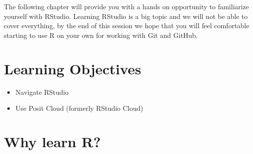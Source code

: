 \documentclass[
  letterpaper,
  DIV=11,
  numbers=noendperiod]{scrreprt}
\providecommand{\tightlist}{%
  \setlength{\itemsep}{0pt}\setlength{\parskip}{0pt}}\usepackage{longtable,booktabs,array}
\begin{document}
The following chapter will provide you with a hands on opportunity to
familiarize yourself with RStudio. Learning RStudio is a big topic and
we will not be able to cover everything, by the end of this session we
hope that you will feel comfortable starting to use R on your own for
working with Git and GitHub.

\hypertarget{learning-objectives}{%
\section{Learning Objectives}\label{learning-objectives}}

\begin{itemize}
\tightlist
\item
  Navigate RStudio
\item
  Use Posit Cloud (formerly RStudio Cloud)
\end{itemize}

\hypertarget{why-learn-r}{%
\section{Why learn R?}\label{why-learn-r}}
\end{document}
